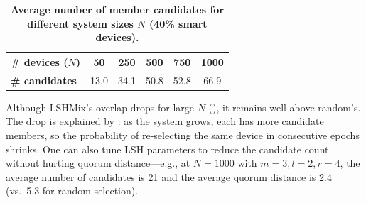 \begin{table}[tb!]
    \centering
    \caption{\bf \small Average number of \kgroup{} member candidates for different system sizes $N$ (40\% smart devices).}
    \bigskip
    \label{comesh:tab:lsh_candidates}
    \footnotesize
    \begin{tabular}{l c c c c c}
        \hline
        \textbf{\# devices ($N$)} & 50 & 250 & 500 & 750 & 1000 \\ \hline
        \textbf{\# candidates} & 13.0 & 34.1 & 50.8 & 52.8 & 66.9 \\
        \hline
    \end{tabular}
    \bigskip
\end{table}

Although LSHMix's overlap drops for large $N$ (), it remains well above random's. The drop is explained by : as the system grows, each \kgroup{} has more candidate members, so the probability of re-selecting the same device in consecutive epochs shrinks. One can also tune LSH parameters to reduce the candidate count without hurting quorum distance---e.g., at $N=1000$ with $m=3, l=2, r=4$, the average number of candidates is 21 and the average quorum distance is 2.4 (vs.\ 5.3 for random \kgroup{} selection).

